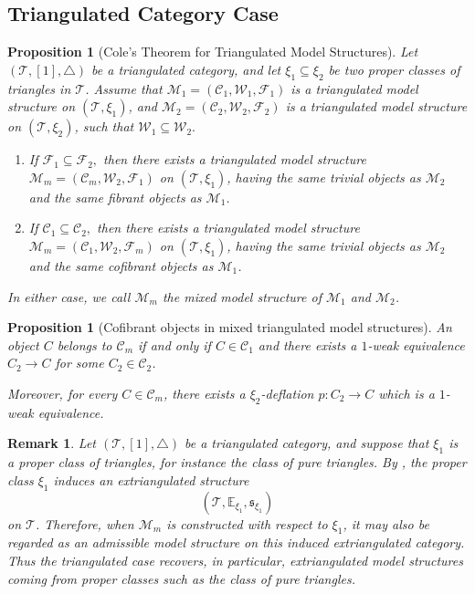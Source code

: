 \documentclass[11pt,a4paper]{amsart}
\numberwithin{equation}{section}
\theoremstyle{plain}
\newtheorem{prop}[thm]{Proposition}
\newtheorem{remark}[thm]{Remark}
\begin{document}
	\subsection*{Triangulated Category Case}
	
	\begin{prop}[Cole's Theorem for Triangulated Model Structures]
	Let $(\mathcal{T},[1],\triangle)$ be a triangulated category, and let
	$\xi_1\subseteq\xi_2$ be two proper classes of triangles in $\mathcal{T}$.
		Assume that
		$
		\mathcal{M}_1=(\mathcal{C}_1,\mathcal{W}_1,\mathcal{F}_1)
		$
		is a triangulated model structure on $(\mathcal{T},\xi_1)$, and
		$
		\mathcal{M}_2=(\mathcal{C}_2,\mathcal{W}_2,\mathcal{F}_2)
		$
		is a triangulated model structure on $(\mathcal{T},\xi_2)$, such that
		$
		\mathcal{W}_1\subseteq \mathcal{W}_2.
		$
		
		\begin{enumerate}
			\item
			If
			$
			\mathcal{F}_1\subseteq \mathcal{F}_2,
			$
			then there exists a triangulated model structure
			$
			\mathcal{M}_m=(\mathcal{C}_m,\mathcal{W}_2,\mathcal{F}_1)
			$
			on $(\mathcal{T},\xi_1)$, having the same trivial objects as $\mathcal{M}_2$ and the same fibrant objects as $\mathcal{M}_1$.
			
			\item
			If
			$
			\mathcal{C}_1\subseteq \mathcal{C}_2,
			$
			then there exists a triangulated model structure
			$
			\mathcal{M}_m=(\mathcal{C}_1,\mathcal{W}_2,\mathcal{F}_m)
			$
			on $(\mathcal{T},\xi_1)$, having the same trivial objects as $\mathcal{M}_2$ and the same cofibrant objects as $\mathcal{M}_1$.
		\end{enumerate}
		
		In either case, we call $\mathcal{M}_m$ the \emph{mixed model structure} of $\mathcal{M}_1$ and $\mathcal{M}_2$.
	\end{prop}



\begin{prop}[Cofibrant objects in mixed triangulated model structures]
	An object $C$ belongs to $\mathcal{C}_m$ if and only if $C\in\mathcal{C}_1$ and there exists a $1$-weak equivalence $C_2 \to C$ for some $C_2\in\mathcal{C}_2$.
	
	Moreover, for every $C\in\mathcal{C}_m$, there exists a $\xi_2$-deflation $p:C_2\to C$ which is a $1$-weak equivalence.
\end{prop}
\begin{remark}
	Let $(\mathcal{T},[1],\triangle)$ be a triangulated category, and suppose
	that $\xi_1$ is a proper class of triangles, for instance the class of pure
	triangles. By \cite[Remark 3.3]{hu2020proper}, the proper class $\xi_1$ induces an
	extriangulated structure
	\[
	(\mathcal{T},\mathbb{E}_{\xi_1},\mathfrak{s}_{\xi_1})
	\]
	on $\mathcal{T}$. Therefore, when $\mathcal{M}_m$ is constructed with
	respect to $\xi_1$, it may also be regarded as an admissible model structure
	on this induced extriangulated category. Thus the triangulated case recovers,
	in particular, extriangulated model structures coming from proper classes
	such as the class of pure triangles.
\end{remark}
\end{document}
